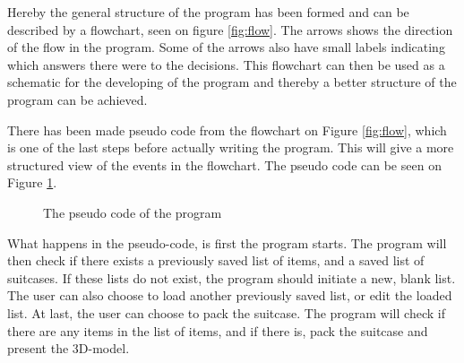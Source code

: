 
Hereby the general structure of the program has been formed and can be described by a flowchart, seen on figure \ref{fig:flow}.
The arrows shows the direction of the flow in the program. Some of the arrows also have small labels indicating which answers there were to the decisions.
This flowchart can then be used as a schematic for the developing of the program and thereby a better structure of the program can be achieved.

There has been made pseudo code from the flowchart on Figure \ref{fig:flow}, which is one of the last steps before actually writing the program. This will give a more structured view of the events in the flowchart. The pseudo code can be seen on Figure \ref{fig:pseudocode}.

\begin{figure}[H] \centering
			
\caption{The pseudo code of the program}\label{fig:pseudocode}
\end{figure}

What happens in the pseudo-code, is first the program starts. The program will then check if there exists a previously saved list of items, and a saved list of suitcases. If these lists do not exist, the program should initiate a new, blank list. The user can also choose to load another previously saved list, or edit the loaded list. At last, the user can choose to pack the suitcase. The program will check if there are any items in the list of items, and if there is, pack the suitcase and present the 3D-model. 